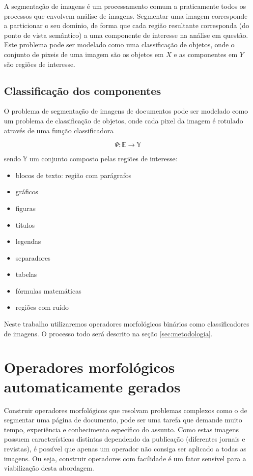 \documentclass[a4paper,11pt]{article}
\begin{document}
A segmentação de imagens é um processamento comum a praticamente
todos os processos que envolvem análise de imagens. Segmentar uma
imagem corresponde a particionar o seu domínio, de forma que cada
região resultante corresponda (do ponto de vista semântico) a uma
componente de interesse na análise em questão. Este problema pode ser modelado como uma classificação de objetos, onde o conjunto de pixeis de uma imagem são os objetos em $X$ e as componentes em $Y$ são regiões de interesse.

\subsection{Classificação dos componentes}
\label{sec:components}

O problema de segmentação de imagens de documentos pode ser modelado como um problema de classificação de objetos, onde cada pixel da imagem é rotulado através de uma função classificadora

\begin{equation}
\Psi \colon \mathbb{E} \rightarrow \mathbb{Y}
\end{equation}

sendo $\mathbb{Y}$ um conjunto composto pelas regiões de interesse:

\begin{itemize}
  \item blocos de texto: região com parágrafos
  \item gráficos
  \item figuras
  \item títulos
  \item legendas
  \item separadores
  \item tabelas
  \item fórmulas matemáticas
  \item regiões com ruído
\end{itemize}

Neste trabalho utilizaremos operadores morfológicos binários como classificadores de imagens. O processo todo será descrito na seção \ref{sec:metodologia}.

\clearpage

\section{Operadores morfológicos automaticamente gerados}
\label{sec:op_morph}

Construir operadores morfológicos que resolvam problemas complexos como o de segmentar uma página de documento, pode ser uma tarefa que demande muito tempo, experiência e conhecimento específico do assunto. Como estas imagens possuem características distintas dependendo da publicação (diferentes jornais e revistas), é possível que apenas um operador não consiga ser aplicado a todas as imagens. Ou seja, construir operadores com facilidade é um fator sensível para a viabilização desta abordagem.
\end{document}
